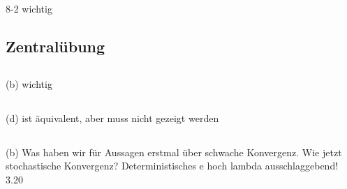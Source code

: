 \documentclass[a4paper]{article}
\begin{document}
8-2 wichtig

\makeexheader

\subsection{Zentralübung}

\subsection{}

(b) wichtig

\subsection{}

(d) ist äquivalent, aber muss nicht gezeigt werden

\subsection{}

(b) Was haben wir für Aussagen erstmal über schwache Konvergenz. Wie jetzt stochastische Konvergenz? Deterministisches e hoch lambda ausschlaggebend! 3.20
\end{document}
